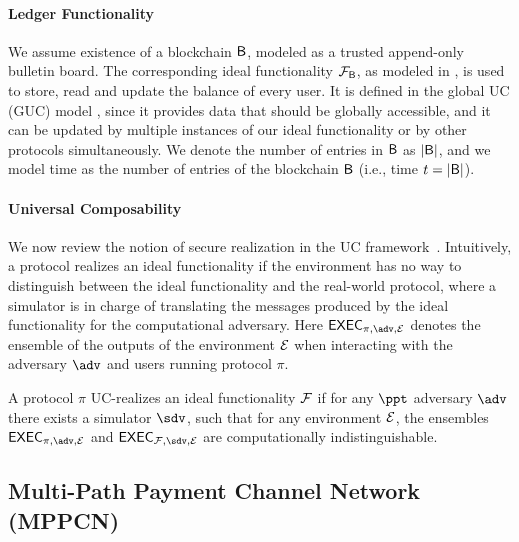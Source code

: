 \paragraph{Ledger Functionality}
We assume existence of a blockchain $\mathsf{B}$, modeled as a trusted append-only bulletin board. 
The corresponding ideal functionality $\mathcal{F}_{\mathsf{B}}$, as modeled in \cite{perun}, is used to 
store, read and update the balance of every user. It is defined in the 
global UC (GUC) model \cite{guc}, since it provides data that should be globally accessible, 
and it can be updated by multiple instances of our ideal functionality or by other protocols 
simultaneously. We denote the number of entries in $\mathsf{B}$ as $|\mathsf{B}|$, and we model time as the 
number of entries of the blockchain $\mathsf{B}$ (i.e., time $t = |\mathsf{B}|$).



\paragraph{Universal Composability}
We now review the notion of secure realization in the UC framework~\cite{canetti}. 
Intuitively, a protocol realizes an ideal functionality if the environment has no way 
to distinguish between the ideal functionality and the real-world protocol, where 
a simulator is in charge of translating the messages produced by the ideal functionality 
for the computational adversary. Here $\exec_{\pi, \adv, \dist}$ denotes the ensemble of 
the outputs of the environment $\mathcal{E}$ when interacting with the adversary $\adv$ and 
users running protocol $\pi$.

\begin{definition}
A protocol $\pi$ UC-realizes an ideal functionality $\mathcal{F}$ if for any $\ppt$ adversary 
$\adv$ there exists a simulator $\sdv$, such that for any environment $\mathcal{E}$, the 
ensembles $\exec_{\pi, \adv, \dist}$ and $\exec_{\FF, \sdv, \dist}$ are computationally 
indistinguishable.
\end{definition}

\subsection{Multi-Path Payment Channel Network (MPPCN)}
\label{sec:mppcn}

